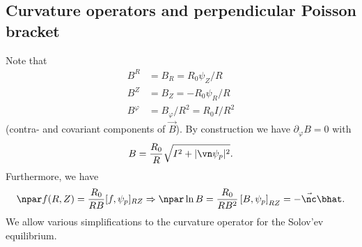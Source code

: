 \subsection{Curvature operators and perpendicular Poisson bracket}
Note that
\begin{align}
    B^R&=B_R = R_0\psi_Z/R \\
    B^Z&=B_Z = - R_0\psi_R/R \\
    B^\varphi &= B_\varphi/R^2 = R_0I/R^2
\end{align}
(contra- and covariant components of $\vec B$).
By construction we have $\partial_\varphi B = 0$ with
\begin{align}
  B = \frac{R_0}{R}\sqrt{ {I^2 + |\vn \psi_p|^2}}.
    \label{}
\end{align}
Furthermore, we have
\begin{align}
  \npar f(R,Z) = \frac{R_0}{RB}[f,\psi_p]_{RZ}\Rightarrow \npar \ln B = \frac{R_0}{RB^2}\left[B, \psi_p\right]_{RZ} = -\vec\nc\bhat.
\end{align}
We allow various simplifications to the curvature operator
for the Solov'ev equilibrium.


